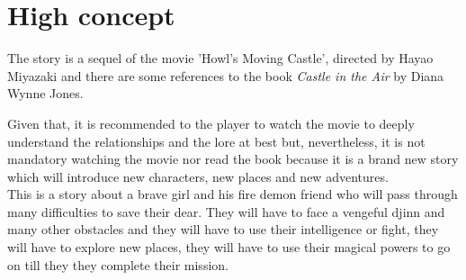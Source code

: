 \section{High concept}

The story is a sequel of the movie 'Howl's Moving Castle', directed by Hayao Miyazaki and there are some references to the book \textit{Castle in the Air} by Diana Wynne Jones.

Given that, it is recommended to the player to watch the movie to deeply understand the relationships and the lore at best but, nevertheless, it is not mandatory watching the movie nor read the book because it is a brand new story which will introduce new characters, new places and new adventures.\\

This is a story about a brave girl and his fire demon friend who will pass through many difficulties to save their dear. They will have to face a vengeful djinn and many other obstacles and they will have to use their intelligence or fight, they will have to explore new places, they  will have to use their magical powers to go on till they they complete their mission. 


